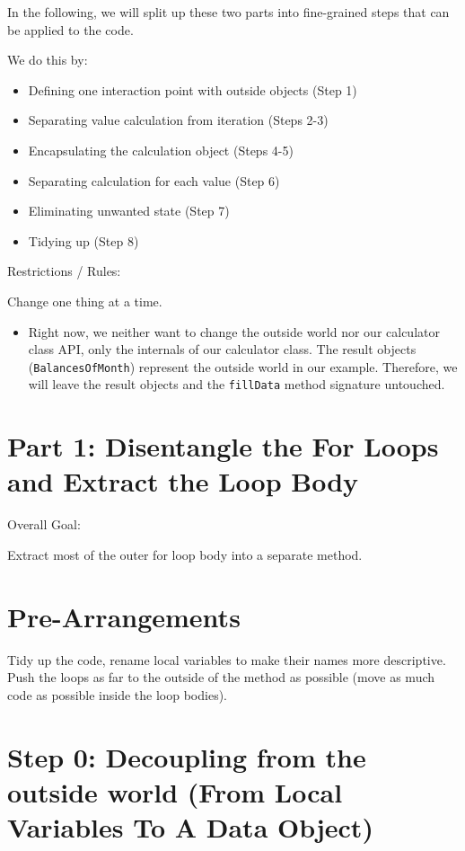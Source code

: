 \documentclass[a4paper,fleqn,titlepage,11pt]{article}
\begin{document}
In the following, we will split up these two parts into fine-grained steps that can be applied to the code.

We do this by:
\begin{itemize}
	\item Defining one interaction point with outside objects (Step 1)
	\item Separating value calculation from iteration (Steps 2-3)
	\item Encapsulating the calculation object (Steps 4-5)
	\item Separating calculation for each value (Step 6)
	\item Eliminating unwanted state (Step 7)
	\item Tidying up (Step 8)
\end{itemize}

Restrictions / Rules:

Change one thing at a time.

\begin{itemize}
\item Right now, we neither want to change the outside world nor our calculator class API, only the internals of our calculator class. The result objects (\texttt{BalancesOfMonth}) represent the outside world in our example. Therefore, we will leave the result objects and the \texttt{fillData} method signature untouched. 
\end{itemize}


\section{Part 1: Disentangle the For Loops and Extract the Loop Body}

Overall Goal:

Extract most of the outer for loop body into a separate method.

\section{Pre-Arrangements}

Tidy up the code, rename local variables to make their names more descriptive.
Push the loops as far to the outside of the method as possible (move as much code as possible inside the loop bodies).

\section{Step 0: Decoupling from the outside world (From Local Variables To A Data Object)}
\end{document}
